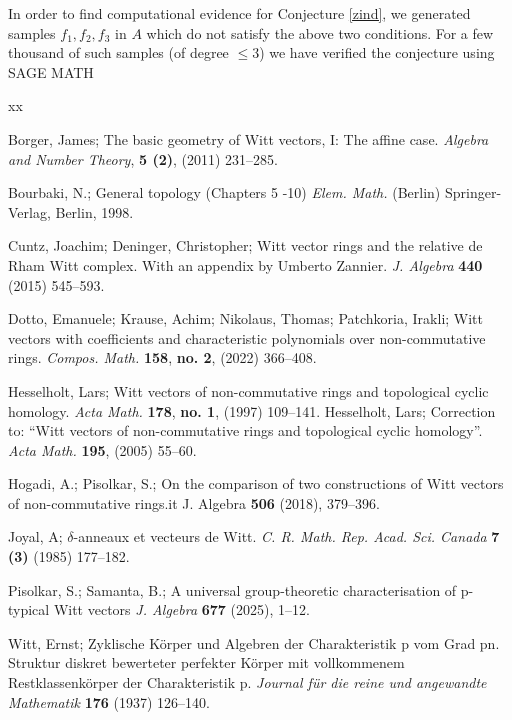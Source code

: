 \documentclass[11pt]{amsart}
\theoremstyle{plain}
\theoremstyle{definition}
\begin{document}
\noindent In order to find computational evidence for Conjecture \ref{zind}, we generated samples $f_1,f_2,f_3$ in $A$ which do not satisfy the above two conditions. For a few thousand of such samples (of degree $\leq 3$) we have verified the conjecture using SAGE MATH 

\begin{thebibliography}{xx}

 Borger, James; The basic geometry of Witt vectors, I: The affine case. {\it Algebra and Number Theory}, {\bf 5 (2)}, (2011) 231--285. 

 Bourbaki, N.;  General topology (Chapters 5 -10) {\it Elem. Math.} (Berlin)
Springer-Verlag, Berlin, 1998.

 Cuntz, Joachim; Deninger, Christopher; Witt vector rings and the relative de Rham Witt complex. With an appendix by Umberto Zannier. {\it J. Algebra} {\bf 440} (2015)  545--593. 

 Dotto, Emanuele; Krause, Achim; Nikolaus, Thomas; Patchkoria, Irakli; Witt vectors with coefficients and characteristic polynomials over non-commutative rings. 
{\it Compos. Math.} {\bf 158}, {\bf no. 2}, (2022) 366--408.

 Hesselholt, Lars; Witt vectors of non-commutative rings and topological cyclic homology. {\it Acta Math. } {\bf 178}, {\bf no. 1}, (1997) 109--141. 
 Hesselholt, Lars; Correction to: ``Witt vectors of non-commutative rings and topological cyclic homology''. {\it Acta Math.} {\bf 195}, (2005)  55--60.

 Hogadi, A.; Pisolkar, S.; On the comparison of two constructions of Witt vectors of non-commutative rings.{it J. Algebra} {\bf 506} (2018), 379--396.

 Joyal, A; $\delta$-anneaux et vecteurs de Witt. {\it C. R. Math. Rep. Acad. Sci. Canada} {\bf 7 (3)} (1985) 177--182.

 Pisolkar, S.; Samanta, B.;  A universal group-theoretic characterisation of  p-typical Witt vectors
{\it J. Algebra} {\bf 677} (2025), 1--12.

 Witt, Ernst; Zyklische Körper und Algebren der Charakteristik p vom Grad pn. Struktur diskret bewerteter perfekter Körper mit vollkommenem Restklassenkörper der Charakteristik p. {\it Journal für die reine und angewandte Mathematik} {\bf 176} (1937) 126--140.

\end{thebibliography}

\end{document}
